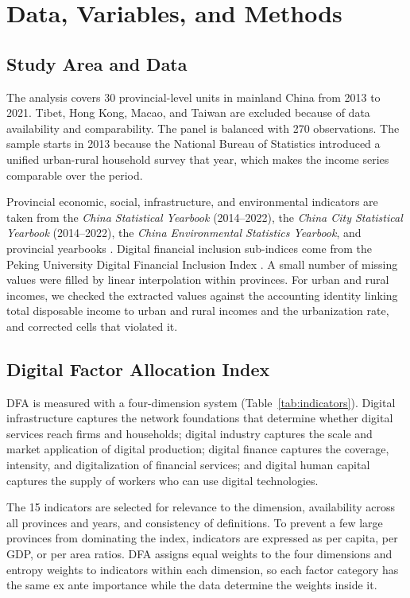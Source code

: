 \section{Data, Variables, and Methods}\label{sec:data}

\subsection{Study Area and Data}

The analysis covers 30 provincial-level units in mainland China from 2013 to 2021. Tibet, Hong Kong, Macao, and Taiwan are excluded because of data availability and comparability. The panel is balanced with 270 observations. The sample starts in 2013 because the National Bureau of Statistics introduced a unified urban-rural household survey that year, which makes the income series comparable over the period.

Provincial economic, social, infrastructure, and environmental indicators are taken from the \emph{China Statistical Yearbook} (2014--2022), the \emph{China City Statistical Yearbook} (2014--2022), the \emph{China Environmental Statistics Yearbook}, and provincial yearbooks \citep{nbs2022,nbscity2022}. Digital financial inclusion sub-indices come from the Peking University Digital Financial Inclusion Index \citep{pku2021}. A small number of missing values were filled by linear interpolation within provinces. For urban and rural incomes, we checked the extracted values against the accounting identity linking total disposable income to urban and rural incomes and the urbanization rate, and corrected cells that violated it.

\subsection{Digital Factor Allocation Index}

DFA is measured with a four-dimension system (Table~\ref{tab:indicators}). Digital infrastructure captures the network foundations that determine whether digital services reach firms and households; digital industry captures the scale and market application of digital production; digital finance captures the coverage, intensity, and digitalization of financial services; and digital human capital captures the supply of workers who can use digital technologies.

The 15 indicators are selected for relevance to the dimension, availability across all provinces and years, and consistency of definitions. To prevent a few large provinces from dominating the index, indicators are expressed as per capita, per GDP, or per area ratios. DFA assigns equal weights to the four dimensions and entropy weights to indicators within each dimension, so each factor category has the same ex ante importance while the data determine the weights inside it.

